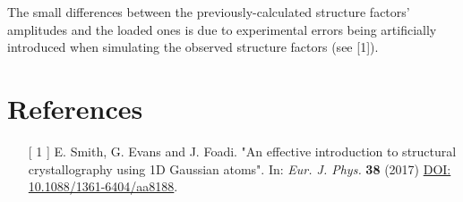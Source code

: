 \documentclass[12pt,a4paper]{article}\usepackage[]{graphicx}\usepackage[]{color}
\begin{document}
\noindent The small differences between the previously-calculated structure factors' amplitudes and the loaded ones is due to experimental errors being artificially introduced when simulating the observed structure factors (see [1]).

\section*{References}
\begin{itemize}
\item[[ 1]] E. Smith, G. Evans and J. Foadi. "An effective introduction to structural crystallography using 1D Gaussian atoms". In: \emph{Eur. J. Phys.} {\bf 38} (2017) \href{https://doi.org/10.1088/1361-6404/aa8188}{DOI: 10.1088/1361-6404/aa8188}.
\end{itemize}
\end{document}
